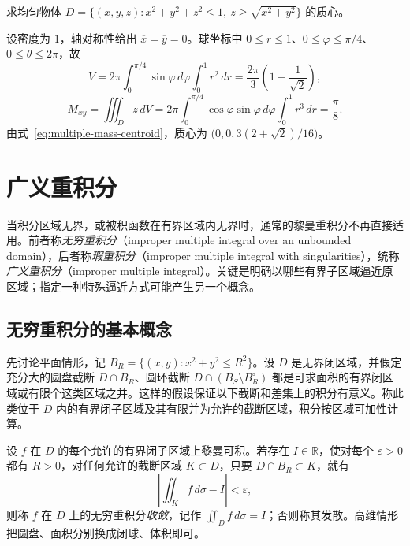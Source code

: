 \begin{example}
\label{ex:multiple-spherical-cone-centroid}
求均匀物体 $D=\{(x,y,z):x^2+y^2+z^2\leq1,\ z\geq\sqrt{x^2+y^2}\}$ 的质心。
\end{example}
\begin{solve}
设密度为 $1$，轴对称性给出 $\overline x=\overline y=0$。球坐标中 $0\leq r\leq1$、$0\leq\varphi\leq\pi/4$、$0\leq\theta\leq2\pi$，故
\[
    V=2\pi\int_0^{\pi/4}\sin\varphi\,d\varphi\int_0^1r^2\,dr
    =\frac{2\pi}{3}\left(1-\frac1{\sqrt2}\right),
\]
\[
    M_{xy}=\iiint_Dz\,dV
    =2\pi\int_0^{\pi/4}\cos\varphi\sin\varphi\,d\varphi\int_0^1r^3\,dr
    =\frac\pi8.
\]
由式~\eqref{eq:multiple-mass-centroid}，质心为 $\bigl(0,0,3(2+\sqrt2)/16\bigr)$。
\end{solve}

\section{广义重积分}
\label{sec:improper-multiple-integrals}

当积分区域无界，或被积函数在有界区域内无界时，通常的黎曼重积分不再直接适用。前者称\emph{无穷重积分}（improper multiple integral over an unbounded domain），后者称\emph{瑕重积分}（improper multiple integral with singularities），统称\emph{广义重积分}（improper multiple integral）。关键是明确以哪些有界子区域逼近原区域；指定一种特殊逼近方式可能产生另一个概念。

\subsection{无穷重积分的基本概念}
\label{subsec:basic-concepts-of-infinite-multiple-integrals}

先讨论平面情形，记 $B_R=\{(x,y):x^2+y^2\leq R^2\}$。设 $D$ 是无界闭区域，并假定充分大的圆盘截断 $D\cap B_R$、圆环截断 $D\cap(B_S\setminus B_R^\circ)$ 都是可求面积的有界闭区域或有限个这类区域之并。这样的假设保证以下截断和差集上的积分有意义。称此类位于 $D$ 内的有界闭子区域及其有限并为允许的截断区域，积分按区域可加性计算。

\begin{definition}
\label{def:multiple-improper-at-infinity}
设 $f$ 在 $D$ 的每个允许的有界闭子区域上黎曼可积。若存在 $I\in\mathbb R$，使对每个 $\varepsilon>0$ 都有 $R>0$，对任何允许的截断区域 $K\subset D$，只要 $D\cap B_R\subset K$，就有
\begin{equation}
    \left|\iint_Kf\,d\sigma-I\right|<\varepsilon,
    \label{eq:multiple-improper-unrestricted-limit}
\end{equation}
则称 $f$ 在 $D$ 上的无穷重积分\emph{收敛}，记作 $\iint_Df\,d\sigma=I$；否则称其发散。高维情形把圆盘、面积分别换成闭球、体积即可。
\end{definition}

